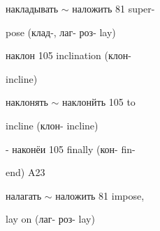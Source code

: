 \begin{minipage}[t]{0.475\textwidth}
\noindent накладывать $\sim$ наложить 81 super-\par
\noindent pose (клад-, лаг- роз- lay)\par
\noindent наклон 105 inclination (клон-\par
\noindent incline)\par
\noindent наклонять $\sim$ наклонйть 105 to\par
\noindent incline (клон- incline)\par
\noindent - наконёи 105 finally (кон- fin-\par
\noindent end) A23\par
\noindent налагать $\sim$ наложить 81 impose,\par
\noindent lay on (лаг- роз- lay)\par
\end{minipage}
\endgroup

